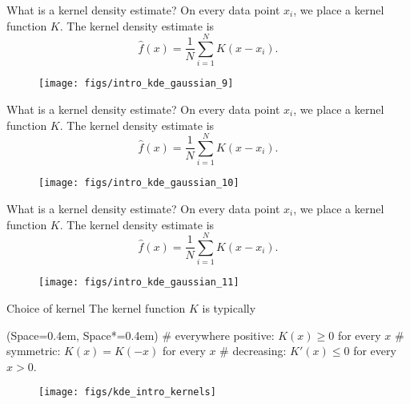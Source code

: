 \documentclass[11pt, aspectratio=149]{beamer}
\newcommand{\listSpace}{0.4em}
\theoremstyle{plain}
\begin{document}
\begin{frame}[fragile, t]{What is a kernel density estimate?}
	On every data point $x_i$, we place a kernel function $K$.
	The kernel density estimate is 
	\begin{equation*}
	\hat{f}(x) = \frac{1}{N} \sum_{i=1}^{N} K(x - x_i).
	\end{equation*}
	\vfill
	\begin{figure}
		\centering
		\texttt{[image: figs/intro\_kde\_gaussian\_9]}
	\end{figure}
\end{frame}


\begin{frame}[fragile, t]{What is a kernel density estimate?}
	On every data point $x_i$, we place a kernel function $K$.
	The kernel density estimate is 
	\begin{equation*}
	\hat{f}(x) = \frac{1}{N} \sum_{i=1}^{N} K(x - x_i).
	\end{equation*}
	\vfill
	\begin{figure}
		\centering
		\texttt{[image: figs/intro\_kde\_gaussian\_10]}
	\end{figure}
\end{frame}


\begin{frame}[fragile, t]{What is a kernel density estimate?}
	On every data point $x_i$, we place a kernel function $K$.
	The kernel density estimate is 
	\begin{equation*}
	\hat{f}(x) = \frac{1}{N} \sum_{i=1}^{N} K(x - x_i).
	\end{equation*}
	\vfill
	\begin{figure}
		\centering
		\texttt{[image: figs/intro\_kde\_gaussian\_11]}
	\end{figure}
\end{frame}


\begin{frame}[fragile, t]{Choice of kernel}
	The kernel function $K$ is typically
	\vspace{1em}
	\begin{easylist}[itemize]
		\ListProperties(Space=\listSpace, Space*=\listSpace)
		# everywhere positive: $K(x) \geq 0$ for every $x$
		# symmetric: $K(x) = K(-x)$  for every $x$
		# decreasing: $K'(x) \leq 0$  for every $x > 0$.
	\end{easylist}
	\vfill
	\begin{figure}
		\centering
		\texttt{[image: figs/kde\_intro\_kernels]}
	\end{figure}
\end{frame}
\end{document}
